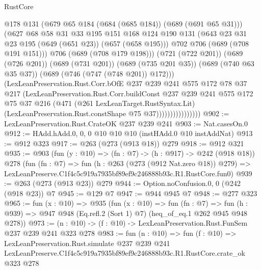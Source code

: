 \begin{lexlean}{RustCore}
\begin{coremodule}
                                @178
                                @131
                                (@679 @65 @184 (@684 (@685 @184)) (@689 (@691 @65 @31)))
                                (@627
                                  @68
                                  @58
                                  @31
                                  @33
                                  @195
                                  @151
                                  @168
                                  @124
                                  @190
                                  @131
                                  (@643 @23 @31 @23 @195 (@649 (@651 @23)) (@657 (@658 @195)))
                                  @702
                                  @706
                                  (@689 (@708 @191 @151)))
                                @706
                                (@689 (@708 @179 @198)))
                              (@721 (@722 @201))
                              (@689 (@726 @201))
                              (@689 (@731 @201))
                              (@689 (@735 @201 @35))
                              (@689 (@740 @63 @35 @37))
                              (@689 (@746 (@747 (@748 @201)) @172)))
                            (LexLeanPreservation.Rust.Corr.bOfE
                              @237
                              @239
                              @241
                              @575
                              @172
                              @78
                              @37
                              @217
                              (LexLeanPreservation.Rust.Corr.buildConst
                                @237
                                @239
                                @241
                                @575
                                @172
                                @75
                                @37
                                @216
                                (@471
                                  (@261 LexLeanTarget.RustSyntax.Lit)
                                  (LexLeanPreservation.Rust.constShape @75 @37))))))))))))))))
@902 := LexLeanPreservation.Rust.CrateOK @237 @239 @241
@903 := Nat.casesOn.{0}
@912 := HAdd.hAdd.{0, 0, 0} @10 @10 @10 (instHAdd.{0} @10 instAddNat)
@913 := @912 @323
@917 := @263 (@273 (@913 @18)) @279
@918 := @912 @321
@935 := @903
    (fun (y : @10) => (fn : @7) -> (h : @917) -> @242 (@918 @18))
    @278
    (fun (fn : @7) =>
    fun (h : @263 (@273 (@912 Nat.zero @18)) @279) =>
    LexLeanPreserve.C1f4c5c919a7935bf89ef9c246888b93c.R1.RustCore.fun0)
@939 := @263 (@273 (@913 @23)) @279
@944 := Option.noConfusion.{0, 0} (@242 (@918 @23)) @7
@945 := @129 @7
@947 := @944 @945 @7
@948 := @277 @323
@965 := fun (x : @10) =>
  @935
    (fun (x : @10) =>
    fun (fn : @7) =>
    fun (h : @939) => @947 @948 (Eq.refl.{2} (Sort 1) @7) (heq_of_eq.{1} @262 @945 @948 @278))
@973 := (n : @10) -> (f : @10) -> LexLeanPreservation.Rust.FunSem @237 @239 @241 @323 @278
@983 := fun (n : @10) =>
  fun (f : @10) =>
  LexLeanPreservation.Rust.simulate
    @237
    @239
    @241
    LexLeanPreserve.C1f4c5c919a7935bf89ef9c246888b93c.R1.RustCore.crate_ok
    @323
    @278
\end{coremodule}
\end{lexlean}
